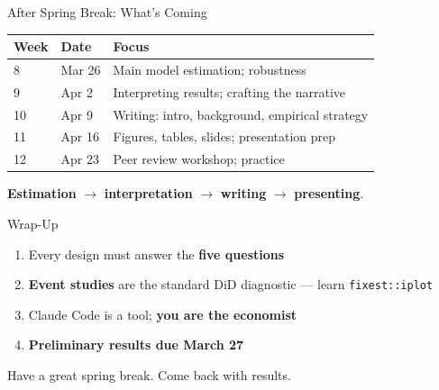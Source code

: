 \begin{frame}{After Spring Break: What's Coming}
  \small
  \begin{tabular}{@{}llp{5.5cm}@{}}
    \toprule
    \textbf{Week} & \textbf{Date} & \textbf{Focus} \\
    \midrule
    8 & Mar 26 & Main model estimation; robustness \\
    9 & Apr 2 & Interpreting results; crafting the narrative \\
    10 & Apr 9 & Writing: intro, background, empirical strategy \\
    11 & Apr 16 & Figures, tables, slides; presentation prep \\
    12 & Apr 23 & Peer review workshop; practice \\
    \bottomrule
  \end{tabular}

  \vspace{6pt}

  \textbf{Estimation} $\to$ \textbf{interpretation} $\to$ \textbf{writing} $\to$ \textbf{presenting}.
\end{frame}

\begin{frame}{Wrap-Up}
  \begin{enumerate}
    \item Every design must answer the \textbf{five questions}
    \item \textbf{Event studies} are the standard DiD diagnostic --- learn \texttt{fixest::iplot}
    \item Claude Code is a tool; \textbf{you are the economist}
    \item \textbf{Preliminary results due March 27}
  \end{enumerate}

  \vspace{8pt}

  Have a great spring break. Come back with results.
\end{frame}


